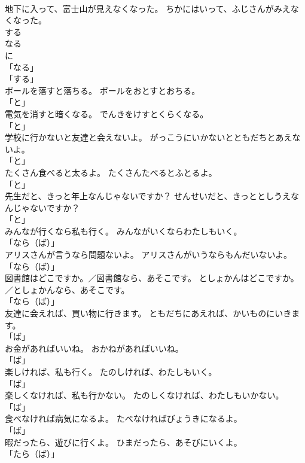 \documentclass[8pt]{extreport}
\begin{document}
\begin{CJK}{UTF8}{min}
\\	地下に入って、富士山が見えなくなった。	ちかにはいって、ふじさんがみえなくなった。	
\\	する 
\\	なる 
\\	に 
\\	「なる」 
\\	「する」 
\\	ボールを落すと落ちる。	ボールをおとすとおちる。	
\\	「と」	
\\	電気を消すと暗くなる。	でんきをけすとくらくなる。	
\\	「と」	
\\	学校に行かないと友達と会えないよ。	がっこうにいかないとともだちとあえないよ。	
\\	「と」	
\\	たくさん食べると太るよ。	たくさんたべるとふとるよ。	
\\	「と」	
\\	先生だと、きっと年上なんじゃないですか？	せんせいだと、きっととしうえなんじゃないですか？	
\\	「と」	
\\	みんなが行くなら私も行く。	みんながいくならわたしもいく。	
\\	「なら（ば）」	
\\	アリスさんが言うなら問題ないよ。	アリスさんがいうならもんだいないよ。	
\\	「なら（ば）」	
\\	図書館はどこですか。／図書館なら、あそこです。	としょかんはどこですか。／としょかんなら、あそこです。	
\\	「なら（ば）」	
\\	友達に会えれば、買い物に行きます。	ともだちにあえれば、かいものにいきます。	
\\	「ば」	
\\	お金があればいいね。	おかねがあればいいね。	
\\	「ば」	
\\	楽しければ、私も行く。	たのしければ、わたしもいく。	
\\	「ば」	
\\	楽しくなければ、私も行かない。	たのしくなければ、わたしもいかない。	
\\	「ば」	
\\	食べなければ病気になるよ。	たべなければびょうきになるよ。	
\\	「ば」	
\\	暇だったら、遊びに行くよ。	ひまだったら、あそびにいくよ。	
\\	「たら（ば）」	

\end{CJK}
\end{document}
